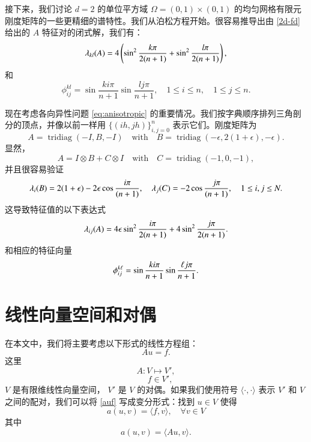 \documentclass[12pt]{acta_2011xz}
\begin{document}
接下来，我们讨论    $d=2$    的单位平方域    $\Omega=(0, 1)\times (0, 1)$    的均匀网格有限元刚度矩阵的一些更精细的谱特性。我们从泊松方程开始。很容易推导出由    \eqref{2d-fd}    给出的    $A$    特征对的闭式解，我们有：
   \begin{equation}
  \label{2d-stiffness-eigenvalue}
\lambda_{kl}(A)
=4\left(\sin^2{{k\pi}\over {2(n+1)}}+\sin^2{{l\pi}\over {2(n+1)}}\right),
\end{equation}    和 
   \begin{equation}
\label{2d-stiffness-eigenvector}
\phi^{kl}_{ij}=\sin\frac{ki\pi}{n+1}\sin\frac{lj\pi}{n+1}, \quad 1\leq i\leq n, \quad 1\leq j\leq n.
\end{equation}     

现在考虑各向异性问题    \eqref{eq:anisotropic}    的重要情况。我们按字典顺序排列三角剖分的顶点，并像以前一样用    $ \{ (ih,jh) \} _{i,j=0}^n$    表示它们。刚度矩阵为
   \begin{equation}
  \label{aniso-A}
	A=\operatorname{tridiag} (-I, B, -I)\quad\mbox{with}\quad
 B=\operatorname{tridiag} (-\epsilon, 2(1+\epsilon), -\epsilon).
\end{equation}    显然，
   $$
	A=I\otimes B+C\otimes I\quad\mbox{with}\quad C=\operatorname{tridiag}(-1,0,-1),
$$    并且很容易验证
   $$
\lambda_i(B)=2(1+\epsilon)-2\epsilon\cos{{i\pi}\over {(n+1)}}, \quad
\lambda_j(C)=-2\cos{{j\pi}\over {(n+1)}},\quad 1\leq i,j\leq N.
$$    这导致特征值的以下表达式
   $$
\lambda_{ij}(A)
=4\epsilon\sin^2{{i\pi}\over {2(n+1)}}+4\sin^2{{j\pi}\over {2(n+1)}}.
$$    和相应的特征向量
   $$
\phi_{ij}^{k\ell}=\sin{{ki\pi}\over {n+1}}\sin{{\ell j\pi}\over {n+1}}.
$$     

   \section{线性向量空间和对偶  }       \label{s:duals}    在本文中，我们将主要考虑以下形式的线性方程组：
   \begin{equation}
  \label{auf}
Au=f.  
\end{equation}    这里 
   \begin{equation}
A: V\mapsto V',  
\end{equation}    
   $$
 \quad f\in V',
$$    
   $V$    是有限维线性向量空间，   $V'$    是    $V$    的对偶。如果我们使用符号    $\langle\cdot, \cdot\rangle$    表示    $V'$    和    $V$    之间的配对，我们可以将    \eqref{auf}    写成变分形式：找到    $u\in V$    使得
   \begin{equation}
  \label{VariAu=f}
a(u,v)=\langle f, v\rangle, \quad\forall v\in V 
\end{equation}    其中
   \begin{equation}
a(u,v)=\langle Au, v\rangle.  
\end{equation}     
\end{document}
